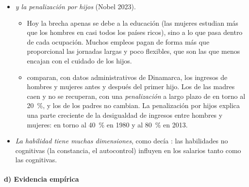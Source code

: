 \documentclass[11pt]{article}
\begin{document}
\begin{itemize}
\item \emph{ y la penalización por hijos} (Nobel 2023\nocite{Nobel2023Goldin}).
  \begin{itemize}
  \item Hoy la brecha apenas se debe a la educación (las mujeres estudian más que los hombres en casi todos los países ricos), sino a lo que pasa dentro de cada ocupación. Muchos empleos pagan de forma más que proporcional las jornadas largas y poco flexibles, que son las que menos encajan con el cuidado de los hijos\nocite{Goldin2014Grand}.
  \item \textcite{KlevenLandaisSogaard2019Children} comparan, con datos administrativos de Dinamarca, los ingresos de hombres y mujeres antes y después del primer hijo. Los de las madres caen y no se recuperan, con una \emph{penalización} a largo plazo de en torno al 20~\%, y los de los padres no cambian. La penalización por hijos explica una parte creciente de la desigualdad de ingresos entre hombres y mujeres: en torno al 40~\% en 1980 y al 80~\% en 2013\nocite{KlevenLandaisSogaard2018NBER}.
  \end{itemize}
\item \emph{La habilidad tiene muchas dimensiones}, como decía : las habilidades no cognitivas (la constancia, el autocontrol) influyen en los salarios tanto como las cognitivas\nocite{HeckmanStixrudUrzua2006}.
\end{itemize}

\paragraph{d) Evidencia empírica}\label{sec:mincer-evidencia}
\end{document}
